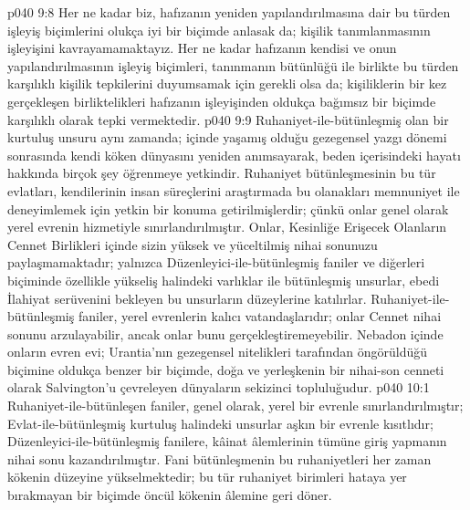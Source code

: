 \vs p040 9:8 Her ne kadar biz, hafızanın yeniden yapılandırılmasına dair bu türden işleyiş biçimlerini olukça iyi bir biçimde anlasak da; kişilik tanımlanmasının işleyişini kavrayamamaktayız. Her ne kadar hafızanın kendisi ve onun yapılandırılmasının işleyiş biçimleri, tanınmanın bütünlüğü ile birlikte bu türden karşılıklı kişilik tepkilerini duyumsamak için gerekli olsa da; kişiliklerin bir kez gerçekleşen birliktelikleri hafızanın işleyişinden oldukça bağımsız bir biçimde karşılıklı olarak tepki vermektedir.
\vs p040 9:9 Ruhaniyet\hyp{}ile\hyp{}bütünleşmiş olan bir kurtuluş unsuru aynı zamanda; içinde yaşamış olduğu gezegensel yazgı dönemi sonrasında kendi köken dünyasını yeniden anımsayarak, beden içerisindeki hayatı hakkında birçok şey öğrenmeye yetkindir. Ruhaniyet bütünleşmesinin bu tür evlatları, kendilerinin insan süreçlerini araştırmada bu olanakları memnuniyet ile deneyimlemek için yetkin bir konuma getirilmişlerdir; çünkü onlar genel olarak yerel evrenin hizmetiyle sınırlandırılmıştır. Onlar, Kesinliğe Erişecek Olanların Cennet Birlikleri içinde sizin yüksek ve yüceltilmiş nihai sonunuzu paylaşmamaktadır; yalnızca Düzenleyici\hyp{}ile\hyp{}bütünleşmiş faniler ve diğerleri biçiminde özellikle yükseliş halindeki varlıklar ile bütünleşmiş unsurlar, ebedi İlahiyat serüvenini bekleyen bu unsurların düzeylerine katılırlar. Ruhaniyet\hyp{}ile\hyp{}bütünleşmiş faniler, yerel evrenlerin kalıcı vatandaşlarıdır; onlar Cennet nihai sonunu arzulayabilir, ancak onlar bunu gerçekleştiremeyebilir. Nebadon içinde onların evren evi; Urantia’nın gezegensel nitelikleri tarafından öngörüldüğü biçimine oldukça benzer bir biçimde, doğa ve yerleşkenin bir nihai\hyp{}son cenneti olarak Salvington’u çevreleyen dünyaların sekizinci topluluğudur.
\vs p040 10:1 Ruhaniyet\hyp{}ile\hyp{}bütünleşen faniler, genel olarak, yerel bir evrenle sınırlandırılmıştır; Evlat\hyp{}ile\hyp{}bütünleşmiş kurtuluş halindeki unsurlar aşkın bir evrenle kısıtlıdır; Düzenleyici\hyp{}ile\hyp{}bütünleşmiş fanilere, kâinat âlemlerinin tümüne giriş yapmanın nihai sonu kazandırılmıştır. Fani bütünleşmenin bu ruhaniyetleri her zaman kökenin düzeyine yükselmektedir; bu tür ruhaniyet birimleri hataya yer bırakmayan bir biçimde öncül kökenin âlemine geri döner.
